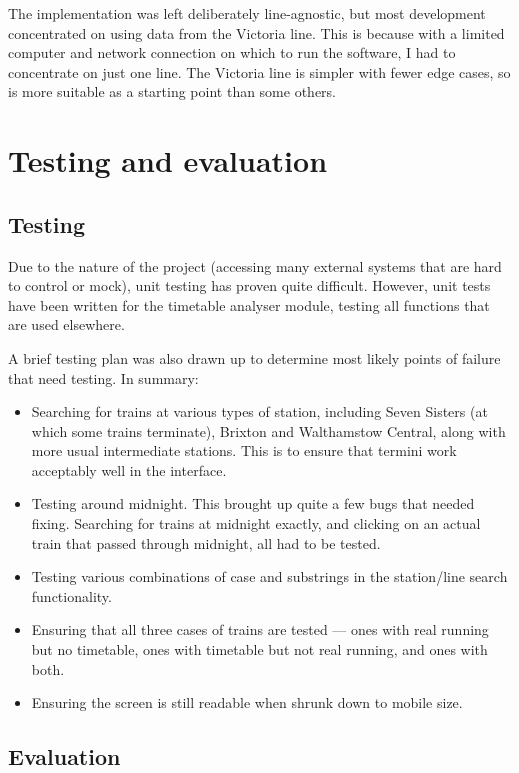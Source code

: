 \documentclass[a4paper,12pt]{report}
\begin{document}
The implementation was left deliberately line-agnostic, but most development
concentrated on using data from the Victoria line. This is because with a
limited computer and network connection on which to run the software, I had to
concentrate on just one line. The Victoria line is simpler with fewer edge
cases, so is more suitable as a starting point than some others.

\chapter{Testing and evaluation}

\section{Testing}

Due to the nature of the project (accessing many external systems that are hard
to control or mock), unit testing has proven quite difficult. However, unit
tests have been written for the timetable analyser module, testing all
functions that are used elsewhere.

A brief testing plan was also drawn up to determine most likely points of
failure that need testing. In summary:

\begin{itemize}
  \item Searching for trains at various types of station, including Seven
    Sisters (at which some trains terminate), Brixton and Walthamstow Central,
    along with more usual intermediate stations. This is to ensure that termini
    work acceptably well in the interface.
  \item Testing around midnight. This brought up quite a few bugs that needed
    fixing. Searching for trains at midnight exactly, and clicking on an actual
    train that passed through midnight, all had to be tested.
  \item Testing various combinations of case and substrings in the station/line
    search functionality.
  \item Ensuring that all three cases of trains are tested --- ones with real
    running but no timetable, ones with timetable but not real running, and
    ones with both.
  \item Ensuring the screen is still readable when shrunk down to mobile size.
\end{itemize}

\section{Evaluation}
\end{document}
